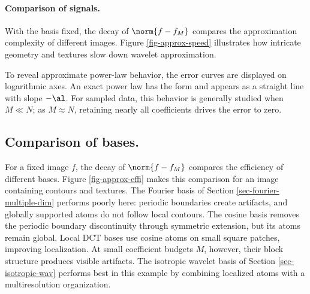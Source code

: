    
\paragraph{Comparison of signals.}

With the basis fixed, the decay of $\norm{f-f_M}$ compares the approximation complexity of different images. Figure \ref{fig-approx-speed} illustrates how intricate geometry and textures slow down wavelet approximation.

To reveal approximate power-law behavior, the error curves are displayed on logarithmic axes. An exact power law has the form
and appears as a straight line with slope $-\al$. For sampled data, this behavior is generally studied when $M \ll N$; as $M \approx N$, retaining nearly all coefficients drives the error to zero.






   
\subsection{Comparison of bases.}

For a fixed image $f$, the decay of $\norm{f-f_M}$ compares the efficiency of different bases. Figure \ref{fig-approx-effi} makes this comparison for an image containing contours and textures. The Fourier basis of Section \ref{sec-fourier-multiple-dim} performs poorly here: periodic boundaries create artifacts, and globally supported atoms do not follow local contours. The cosine basis removes the periodic boundary discontinuity through symmetric extension, but its atoms remain global. Local DCT bases use cosine atoms on small square patches, improving localization. At small coefficient budgets $M$, however, their block structure produces visible artifacts. The isotropic wavelet basis of Section \ref{sec-isotropic-wav} performs best in this example by combining localized atoms with a multiresolution organization.

